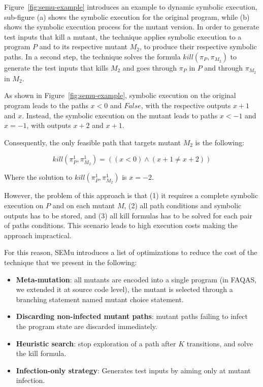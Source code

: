 Figure~\ref{fig:semu-example} introduces an example to dynamic symbolic execution, sub-figure (a) shows the symbolic execution for the original program, while (b) shows the symbolic execution process for the mutant version. In order to generate test inputs that kill a mutant, the technique applies symbolic execution to a program $P$ and to its respective mutant $M_2$, to produce their respective symbolic paths. In a second step, the technique solves the formula $kill(\pi_P, \pi_{M_2})$ to generate the test inputs that kills $M_2$ and goes through $\pi_P$ in $P$ and through $\pi_{M_2}$ in $M_2$. 

As shown in Figure~\ref{fig:semu-example}, symbolic execution on the original program leads to the paths $x < 0$ and $False$, with the respective outputs $x + 1$ and $x$.
Instead, the symbolic execution on the mutant leads to paths $x < -1$ and $x = -1$, with outputs $x + 2$ and $x + 1$.

Consequently, the only feasible path that targets mutant $M_2$ is the following:

\begin{equation}
	kill(\pi_{P}^{1}, \pi_{M_2}^{1}) = ((x < 0) \wedge (x + 1 \neq x + 2) )
\end{equation}

Where the solution to $kill(\pi_{P}^{1}, \pi_{M_2}^{1})$ is $x = -2$.

However, the problem of this approach is that (1) it requires a complete symbolic execution on $P$ and on each mutant $M$, (2) all path conditions and symbolic outputs has to be stored, and (3) all kill formulas has to be solved for each pair of paths conditions. This scenario leads to high execution costs making the approach impractical.

For this reason, SEMu introduces a list of optimizations to reduce the cost of the technique that we present in the following:

\begin{itemize}
	\item \textbf{Meta-mutation}: all mutants are encoded into a single program (in FAQAS, we extended it at source code level), the mutant is selected through a branching statement named mutant choice statement.
	\item \textbf{Discarding non-infected mutant paths}: mutant paths failing to infect the program state are discarded immediately.
	\item \textbf{Heuristic search}: stop exploration of a path after $K$ transitions, and solve the kill formula.
	\item \textbf{Infection-only strategy}: Generates test inputs by aiming only at mutant infection.
\end{itemize}

